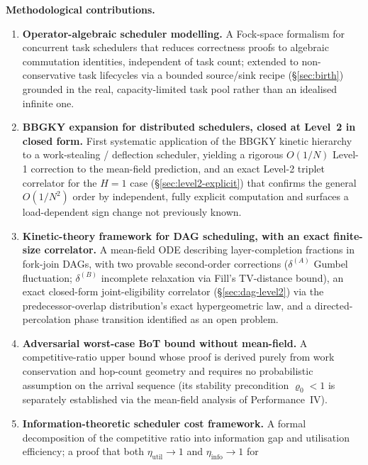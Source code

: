 \documentclass[11pt,a4paper]{report}
\begin{document}
\medskip
\noindent\textbf{Methodological contributions.}
\begin{enumerate}
  \item \textbf{Operator-algebraic scheduler modelling.}
        A Fock-space formalism for concurrent task schedulers that reduces
        correctness proofs to algebraic commutation identities, independent
        of task count; extended to non-conservative task lifecycles via a
        bounded source/sink recipe (\S\ref{sec:birth}) grounded in the real,
        capacity-limited task pool rather than an idealised infinite one.
  \item \textbf{BBGKY expansion for distributed schedulers, closed at
        Level~2 in closed form.}
        First systematic application of the BBGKY kinetic hierarchy to
        a work-stealing / deflection scheduler, yielding a rigorous
        $O(1/N)$ Level-1 correction to the mean-field prediction, and an
        exact Level-2 triplet correlator for the $H=1$ case
        (\S\ref{sec:level2-explicit}) that confirms the general $O(1/N^2)$
        order by independent, fully explicit computation and surfaces a
        load-dependent sign change not previously known.
  \item \textbf{Kinetic-theory framework for DAG scheduling, with an exact
        finite-size correlator.}
        A mean-field ODE describing layer-completion fractions in
        fork-join DAGs, with two provable second-order corrections
        ($\delta^{(A)}$ Gumbel fluctuation; $\delta^{(B)}$ incomplete
        relaxation via Fill's TV-distance bound), an exact closed-form
        joint-eligibility correlator (\S\ref{sec:dag-level2}) via the
        predecessor-overlap distribution's exact hypergeometric law, and
        a directed-percolation phase transition identified as an open
        problem.
  \item \textbf{Adversarial worst-case BoT bound without mean-field.}
        A competitive-ratio upper bound whose proof is derived purely
        from work conservation and hop-count geometry and requires no
        probabilistic assumption on the arrival sequence (its stability
        precondition $\varrho_0 < 1$ is separately established via the
        mean-field analysis of Performance~IV).
  \item \textbf{Information-theoretic scheduler cost framework.}
        A formal decomposition of the competitive ratio into information
        gap and utilisation efficiency; a proof that both
        $\eta_{\mathrm{util}} \to 1$ and $\eta_{\mathrm{info}} \to 1$ for

\end{enumerate}
\end{document}
